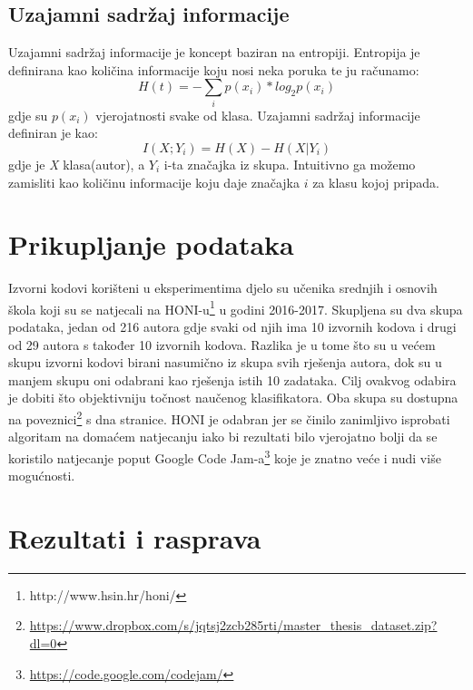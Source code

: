 \subsection{Uzajamni sadržaj informacije} \label{entropy}

Uzajamni sadržaj informacije je koncept baziran na entropiji. Entropija je definirana kao količina informacije koju nosi neka poruka te ju računamo:
\begin{equation}
		H(t) = - \sum_{i} p(x_{i}) * log_2 p(x_{i})
\end{equation}
gdje su $p(x_{i})$ vjerojatnosti svake od klasa. \newline
Uzajamni sadržaj informacije definiran je kao:
\begin{equation}
		I(X;Y_{i}) = H(X) - H(X | Y_{i})
\end{equation}
gdje je \textit{X} klasa(autor), a $Y_{i}$ i-ta značajka iz skupa. Intuitivno ga možemo zamisliti kao količinu informacije koju daje značajka $i$ za klasu kojoj pripada.

\section{Prikupljanje podataka}
Izvorni kodovi korišteni u eksperimentima djelo su učenika srednjih i osnovih škola koji su se natjecali na HONI-u\footnote{http://www.hsin.hr/honi/} u godini 2016-2017. Skupljena su dva skupa podataka, jedan od 216 autora gdje svaki od njih ima 10 izvornih kodova i drugi od 29 autora s također 10 izvornih kodova. Razlika je u tome što su u većem skupu izvorni kodovi birani nasumično iz skupa svih rješenja autora, dok su u manjem skupu oni odabrani kao rješenja istih 10 zadataka. Cilj ovakvog odabira  je dobiti što objektivniju točnost naučenog klasifikatora. Oba skupa su dostupna na poveznici\footnote{\url{https://www.dropbox.com/s/jqtsj2zcb285rti/master_thesis_dataset.zip?dl=0}} s dna stranice. HONI je odabran jer se činilo zanimljivo isprobati algoritam na domaćem natjecanju iako bi rezultati bilo vjerojatno bolji da se koristilo natjecanje poput Google Code Jam-a\footnote{\url{https://code.google.com/codejam/}} koje je znatno veće i nudi više mogućnosti. 

\section{Rezultati i rasprava} \label{results}

